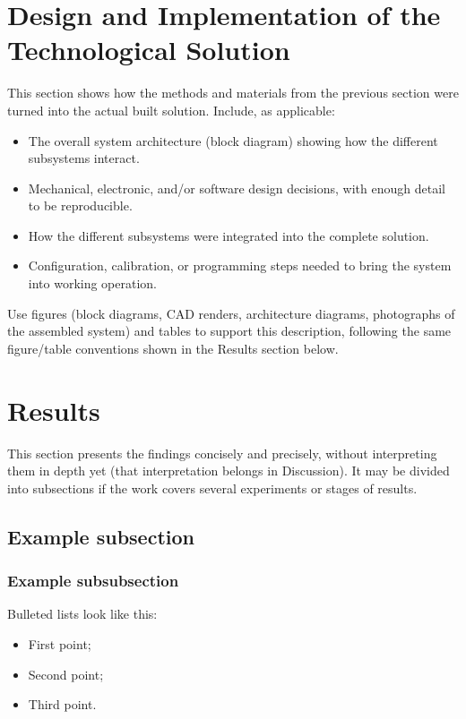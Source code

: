 \documentclass[lettersize,journal]{IEEEtran}
\begin{document}
\section{Design and Implementation of the Technological Solution}
\label{sec:design}

This section shows how the methods and materials from the
previous section were turned into the actual built solution. Include,
as applicable:
\begin{itemize}
\item The overall system architecture (block diagram) showing how
the different subsystems interact.
\item Mechanical, electronic, and/or software design decisions, with
enough detail to be reproducible.
\item How the different subsystems were integrated into the complete
solution.
\item Configuration, calibration, or programming steps needed to
bring the system into working operation.
\end{itemize}
Use figures (block diagrams, CAD renders, architecture diagrams,
photographs of the assembled system) and tables to support this
description, following the same figure/table conventions shown in the
Results section below.

\section{Results}

This section presents the findings concisely and precisely,
without interpreting them in depth yet (that interpretation belongs in
Discussion). It may be divided into subsections if the work covers
several experiments or stages of results.

\subsection{Example subsection}
\subsubsection{Example subsubsection}

Bulleted lists look like this:
\begin{itemize}
\item First point;
\item Second point;
\item Third point.
\end{itemize}
\end{document}
